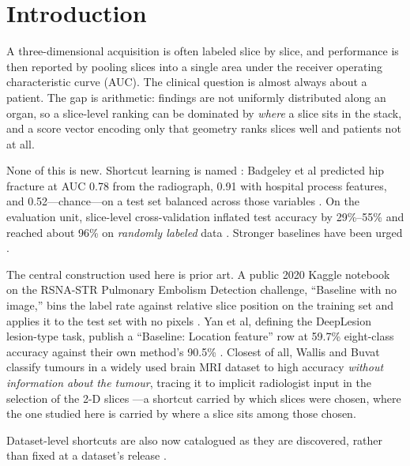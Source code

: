\documentclass[11pt,letterpaper]{article}
\begin{document}
\clearpage

\section*{Introduction}

A three-dimensional acquisition is often labeled slice by slice, and performance
is then reported by pooling slices into a single area under the receiver
operating characteristic curve (AUC). The clinical question is almost always
about a patient. The gap is arithmetic: findings are not uniformly distributed
along an organ, so a slice-level ranking can be dominated by \emph{where} a slice
sits in the stack, and a score vector encoding only that geometry ranks slices
well and patients not at all.

None of this is new. Shortcut learning is named \citep{geirhos2020shortcut}:
Badgeley et al predicted hip fracture at AUC 0.78 from the radiograph, 0.91 with
hospital process features, and 0.52---chance---on a test set balanced across
those variables \citep{badgeley2019hip}. On the evaluation unit, slice-level
cross-validation inflated test accuracy by 29\%--55\% and reached about 96\% on
\emph{randomly labeled} data \citep{yagis2021leakage,tampu2022leakage}. Stronger
baselines have been urged \citep{varoquaux2022failures}.

The central construction used here is prior art. A public 2020 Kaggle notebook
on the RSNA-STR Pulmonary Embolism Detection challenge, ``Baseline with no
image,'' bins the label rate against relative slice position on the training set
and applies it to the test set with no pixels \citep{osciiart2020baseline}. Yan
et al, defining the DeepLesion lesion-type task, publish a ``Baseline: Location
feature'' row at 59.7\% eight-class accuracy against their own method's 90.5\%
\citep{yan2018deeplesiongraphs}. Closest of all, Wallis and Buvat classify
tumours in a widely used brain MRI dataset to high accuracy \emph{without
information about the tumour}, tracing it to implicit radiologist input in the
selection of the 2-D slices \citep{wallis2022cleverhans}---a shortcut carried by
which slices were chosen, where the one studied here is carried by where a slice
sits among those chosen.

Dataset-level shortcuts are also now catalogued as they are discovered, rather
than fixed at a dataset's release \citep{jimenezsanchez2025inthepicture}.
\end{document}
